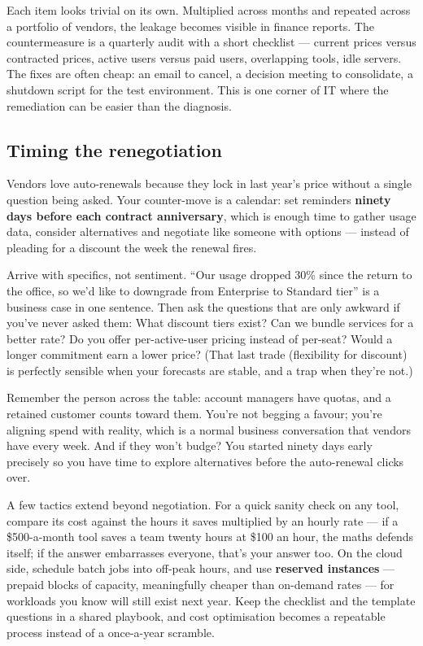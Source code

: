 Each item looks trivial on its own. Multiplied across months and repeated across a portfolio of vendors, the leakage becomes visible in finance reports. The countermeasure is a quarterly audit with a short checklist — current prices versus contracted prices, active users versus paid users, overlapping tools, idle servers. The fixes are often cheap: an email to cancel, a decision meeting to consolidate, a shutdown script for the test environment. This is one corner of IT where the remediation can be easier than the diagnosis.



\subsection{Timing the renegotiation}


Vendors love auto-renewals because they lock in last year's price without a single question being asked. Your counter-move is a calendar: set reminders \textbf{ninety days before each contract anniversary}, which is enough time to gather usage data, consider alternatives and negotiate like someone with options — instead of pleading for a discount the week the renewal fires.


Arrive with specifics, not sentiment. ``Our usage dropped 30\% since the return to the office, so we'd like to downgrade from Enterprise to Standard tier'' is a business case in one sentence. Then ask the questions that are only awkward if you've never asked them: What discount tiers exist? Can we bundle services for a better rate? Do you offer per-active-user pricing instead of per-seat? Would a longer commitment earn a lower price? (That last trade (flexibility for discount) is perfectly sensible when your forecasts are stable, and a trap when they're not.)


Remember the person across the table: account managers have quotas, and a retained customer counts toward them. You're not begging a favour; you're aligning spend with reality, which is a normal business conversation that vendors have every week. And if they won't budge? You started ninety days early precisely so you have time to explore alternatives before the auto-renewal clicks over.


A few tactics extend beyond negotiation. For a quick sanity check on any tool, compare its cost against the hours it saves multiplied by an hourly rate — if a \$500-a-month tool saves a team twenty hours at \$100 an hour, the maths defends itself; if the answer embarrasses everyone, that's your answer too. On the cloud side, schedule batch jobs into off-peak hours, and use \textbf{reserved instances} — prepaid blocks of capacity, meaningfully cheaper than on-demand rates — for workloads you know will still exist next year. Keep the checklist and the template questions in a shared playbook, and cost optimisation becomes a repeatable process instead of a once-a-year scramble.



